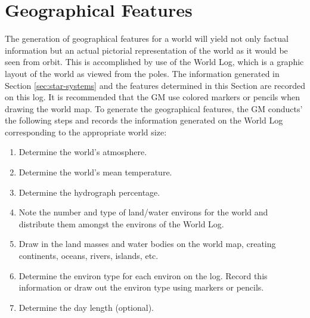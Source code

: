 \begin{table}[htbp]
  \centering
\end{table}

\section{Geographical Features}
\label{sec:geographical-features}

The generation of geographical features for a world will yield not
only factual information but an actual pictorial representation of the
world as it would be seen from orbit. This is accomplished by use of
the World Log, which is a graphic layout of the world as viewed from
the poles. The information generated in Section \ref{sec:star-systems}
and the features determined in this Section are recorded on this log.
It is recommended that the GM use colored markers or pencils when
drawing the world map. To generate the geographical features, the GM
conducts' the following steps and records the information generated on
the World Log corresponding to the appropriate world size:

\begin{enumerate}
\item Determine the world's atmosphere.
\item Determine the world's mean temperature.
\item Determine the hydrograph percentage.
\item Note the number and type of land/water environs for the world
  and distribute them amongst the environs of the World Log.
\item Draw in the land masses and water bodies on the world map,
  creating continents, oceans, rivers, islands, etc.
\item Determine the environ type for each environ on the log. Record
  this information or draw out the environ type using markers or
  pencils.
\item Determine the day length (optional).
\end{enumerate}


